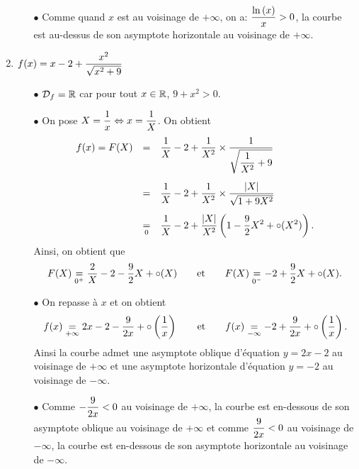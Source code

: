 \documentclass[a4paper, 11pt,reqno]{article}
\begin{document}
\begin{correction}
\begin{enumerate}
\begin{itemize}
			      \item[$\bullet$] Comme quand $x$ est au voisinage de $+\infty$, on a: $\displaystyle\frac{\ln{(x)}}{x}>0$, la courbe est au-dessus de son asymptote horizontale au voisinage de $+\infty$.
		      \end{itemize}
		\item $f(x)=x-2+\displaystyle\frac{x^2}{\sqrt{x^2+9}}$
		      \begin{itemize}
			      \item[$\bullet$] $\mathcal{D}_f=\mathbb{R}$ car pour tout $x\in\mathbb{R}$, $9+x^2>0$.
			      \item[$\bullet$] On pose $X=\displaystyle\frac{1}{x}\Leftrightarrow x= \displaystyle\frac{1}{X}$. On obtient
			            $$\begin{array}{lll}
					            f(x)=F(X) & =               & \ddp\frac{1}{X}-2+\ddp\frac{1}{X^2}\times\ddp\frac{1}{\ddp\sqrt{\frac{1}{X^2} +9 }}\vsec \\
					                      & =               & \ddp\frac{1}{X}-2+\ddp\frac{1}{X^2}\times\ddp\frac{|X|}{\sqrt{1+9X^2}}\vsec              \\
					                      & \underset{0}{=} & \ddp\frac{1}{X}-2+\ddp\frac{|X|}{X^2}\left( 1-\ddp\frac{9}{2}X^2+\circ(X^2) \right).
				            \end{array}$$
			            Ainsi, on obtient que
			            $$F(X)\underset{0^+}{=}\displaystyle\frac{2}{X}-2-\displaystyle\frac{9}{2}X+\circ(X)\qquad \hbox{et}\qquad F(X)\underset{0^-}{=}-2+\displaystyle\frac{9}{2}X+\circ(X).$$
			      \item[$\bullet$] On repasse \`a $x$ et on obtient
			            $$f(x)\underset{+\infty}{=} 2x-2-\displaystyle\frac{9}{2x}+\circ\left( \displaystyle\frac{1}{x}\right)\qquad \hbox{et}\qquad f(x)\underset{-\infty}{=} -2+\displaystyle\frac{9}{2x}+\circ\left( \displaystyle\frac{1}{x}\right).$$
			            Ainsi la courbe admet une asymptote oblique d'\'equation $y=2x-2$ au voisinage de $+\infty$ et une asymptote horizontale d'\'equation $y=-2$ au voisinage de $-\infty$.
			      \item[$\bullet$] Comme $-\displaystyle\frac{9}{2x}<0$ au voisinage de $+\infty$, la courbe est en-dessous de son asymptote oblique au voisinage de $+\infty$ et comme $\displaystyle\frac{9}{2x}<0$ au voisinage de $-\infty$, la courbe est en-dessous de son asymptote horizontale au voisinage de $-\infty$.
		      \end{itemize}

\end{enumerate}
\end{correction}
\end{document}
